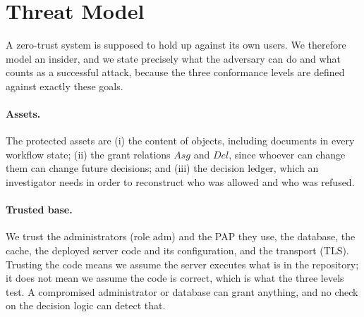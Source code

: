 \documentclass[sigconf,review,anonymous]{acmart}
\begin{document}
\section{Threat Model}
\label{sec:threat}

A zero-trust system is supposed to hold up against its own users. We therefore model an insider, and we
state precisely what the adversary can do and what counts as a successful attack, because the three
conformance levels are defined against exactly these goals.

\paragraph{Assets.} The protected assets are (i) the content of objects, including documents in every
workflow state; (ii) the grant relations $\mathit{Asg}$ and $\mathit{Del}$, since whoever can change them can
change future decisions; and (iii) the decision ledger, which an investigator needs in order to reconstruct who
was allowed and who was refused.

\paragraph{Trusted base.} We trust the administrators (role $\mathrm{adm}$) and the PAP they use, the database,
the cache, the deployed server code and its configuration, and the transport (TLS). Trusting the code means
we assume the server executes what is in the repository; it does not mean we assume the code is correct,
which is what the three levels test. A compromised administrator or database can grant anything, and no
check on the decision logic can detect that.
\end{document}
